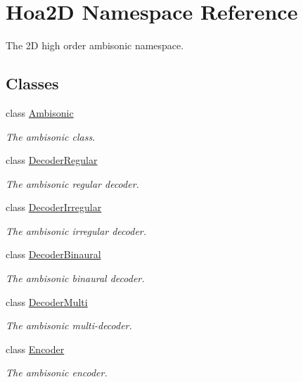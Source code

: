 \hypertarget{namespace_hoa2_d}{\section{Hoa2\-D Namespace Reference}
\label{namespace_hoa2_d}
}


The 2\-D high order ambisonic namespace.  


\subsection*{Classes}
\begin{DoxyCompactItemize}
\item 
class \hyperlink{class_hoa2_d_1_1_ambisonic}{Ambisonic}
\begin{DoxyCompactList}\small\item\em The ambisonic class. \end{DoxyCompactList}\item 
class \hyperlink{class_hoa2_d_1_1_decoder_regular}{Decoder\-Regular}
\begin{DoxyCompactList}\small\item\em The ambisonic regular decoder. \end{DoxyCompactList}\item 
class \hyperlink{class_hoa2_d_1_1_decoder_irregular}{Decoder\-Irregular}
\begin{DoxyCompactList}\small\item\em The ambisonic irregular decoder. \end{DoxyCompactList}\item 
class \hyperlink{class_hoa2_d_1_1_decoder_binaural}{Decoder\-Binaural}
\begin{DoxyCompactList}\small\item\em The ambisonic binaural decoder. \end{DoxyCompactList}\item 
class \hyperlink{class_hoa2_d_1_1_decoder_multi}{Decoder\-Multi}
\begin{DoxyCompactList}\small\item\em The ambisonic multi-\/decoder. \end{DoxyCompactList}\item 
class \hyperlink{class_hoa2_d_1_1_encoder}{Encoder}
\begin{DoxyCompactList}\small\item\em The ambisonic encoder. \end{DoxyCompactList}\item 

\end{DoxyCompactItemize}
